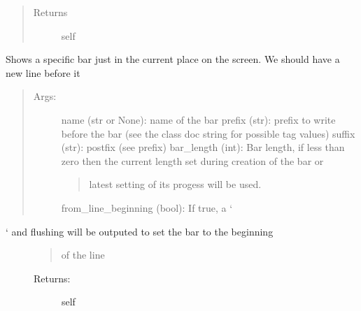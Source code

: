 \documentclass[a4paper,10pt,english]{sphinxmanual}
\begin{document}
\begin{fulllineitems}
\begin{fulllineitems}
\begin{quote}
\begin{description}
\item[{Returns}] \leavevmode
self

\end{description}\end{quote}

\end{fulllineitems}


\begin{fulllineitems}
\label{\detokenize{api/termtools.terminal.ProgressBarController:termtools.terminal.ProgressBarController.show}}
Shows a specific bar just in the current place on the screen. We should have a new line before it
\begin{quote}
\begin{description}
\item[{Args:}] \leavevmode
name (str or None): name of the bar
prefix (str): prefix to write before the bar (see the class doc string for possible tag values)
suffix (str): postfix (see prefix)
bar\_length (int): Bar length, if less than zero then the current length set during creation of the bar or
\begin{quote}

latest setting of its progess will be used.
\end{quote}

from\_line\_beginning (bool): If true, a ‘

\end{description}
\end{quote}
\begin{description}
\item[{‘ and flushing will be outputed to set the bar to the beginning}] \leavevmode\begin{quote}

of the line
\end{quote}
\begin{description}
\item[{Returns:}] \leavevmode
self

\end{description}

\end{description}

\end{fulllineitems}


\end{fulllineitems}
\end{document}
